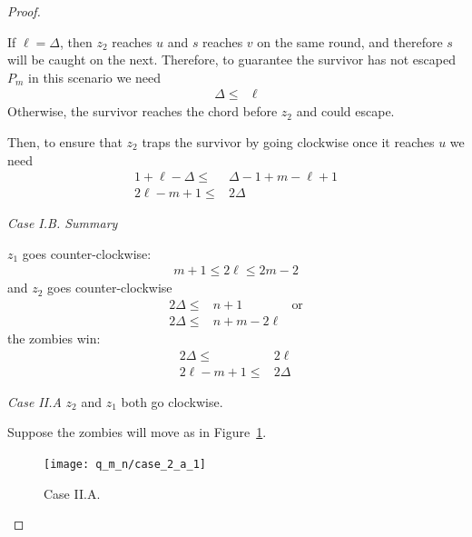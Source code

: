 \begin{proof}
\begin{proofpart}
  If $\ell = \Delta$, then $z_2$ reaches $u$ and $s$
  reaches $v$ on the same round, and therefore $s$ will be caught on the next.
  Therefore, to guarantee the survivor has not escaped $P_m$ in this scenario we need
  \begin{align*}
   \Delta \leq & \ell
  \end{align*}
  Otherwise, the survivor reaches the chord before $z_2$ and could escape.

  Then, to ensure that $z_2$ traps the survivor by going clockwise once
  it reaches $u$ we need
  \begin{align*}
   1 + \ell - \Delta \leq & \Delta -1 + m - \ell + 1 \\
   2\ell - m + 1 \leq     & 2 \Delta
  \end{align*}

  \textit{Case I.B. Summary}

  $z_1$ goes counter-clockwise:
  \begin{align*}
   m + 1 \leq 2 \ell \leq 2m - 2
  \end{align*}
  and $z_2$ goes counter-clockwise
  \begin{align*}
   2 \Delta \leq & n + 1         & \text{or} \\
   2 \Delta \leq & n + m - 2\ell
  \end{align*}
  the zombies win:
  \begin{align*}
   2 \Delta \leq      & 2 \ell   \\
   2\ell - m + 1 \leq & 2 \Delta
  \end{align*}

  \textit{Case II.A} $z_2$ and $z_1$ both go clockwise.

  Suppose the zombies will move as in Figure~\ref{fig:case_2_a_1}.
  \begin{figure}
    \centering
    \texttt{[image: q\_m\_n/case\_2\_a\_1]}
    \caption{Case II.A. \label{fig:case_2_a_1}}
  \end{figure}


\end{proofpart}
\end{proof}
